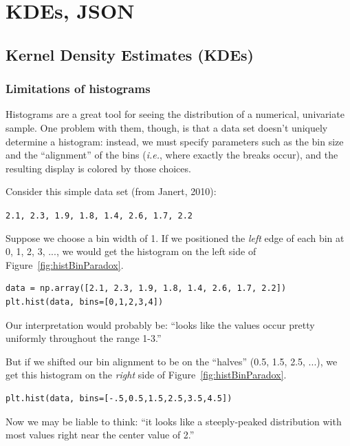 
\chapter{KDEs, JSON}


\section{Kernel Density Estimates (KDEs)}

\subsection{Limitations of histograms}

Histograms are a great tool for seeing the distribution of a numerical,
univariate sample. One problem with them, though, is that a data set doesn't
uniquely determine a histogram: instead, we must specify parameters such as
the bin size and the ``alignment'' of the bins (\textit{i.e.}, where exactly
the breaks occur), and the resulting display is colored by those choices.

Consider this simple data set (from Janert, 2010):

\begin{center}
\texttt{2.1, 2.3, 1.9, 1.8, 1.4, 2.6, 1.7, 2.2}
\end{center}

Suppose we choose a bin width of 1. If we positioned the \textit{left} edge of
each bin at 0, 1, 2, 3, ..., we would get the histogram on the left side of
Figure~\ref{fig:histBinParadox}.

\begin{Verbatim}[fontsize=\footnotesize,samepage=true,frame=single]
data = np.array([2.1, 2.3, 1.9, 1.8, 1.4, 2.6, 1.7, 2.2])
plt.hist(data, bins=[0,1,2,3,4])
\end{Verbatim}

Our interpretation would probably be: ``looks like the values occur pretty
uniformly throughout the range 1-3.''

But if we shifted our bin alignment to be on the ``halves'' (0.5, 1.5, 2.5,
...), we get this histogram on the \textit{right} side of
Figure~\ref{fig:histBinParadox}.

\begin{Verbatim}[fontsize=\footnotesize,samepage=true,frame=single]
plt.hist(data, bins=[-.5,0.5,1.5,2.5,3.5,4.5])
\end{Verbatim}

Now we may be liable to think: ``it looks like a steeply-peaked distribution
with most values right near the center value of 2.''

